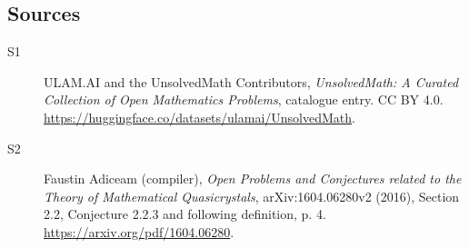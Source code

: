 \documentclass[11pt]{article}
\begin{document}
\subsection{Sources}
\begin{description}
\item[\hypertarget{source:statement:1}{S1}] ULAM.AI and the UnsolvedMath Contributors, \emph{UnsolvedMath: A Curated Collection of Open Mathematics Problems}, catalogue entry. CC BY 4.0. \url{https://huggingface.co/datasets/ulamai/UnsolvedMath}.
\item[\hypertarget{source:statement:2}{S2}] Faustin Adiceam (compiler), \emph{Open Problems and Conjectures related to the Theory of Mathematical Quasicrystals}, arXiv:1604.06280v2 (2016), Section 2.2, Conjecture 2.2.3 and following definition, p. 4. \url{https://arxiv.org/pdf/1604.06280}.
\end{description}
\label{end:statement}
\end{document}
